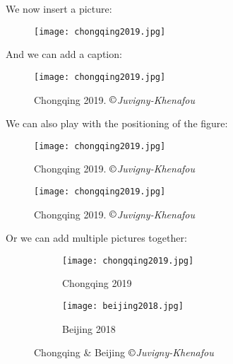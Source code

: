 \documentclass[11pt, a4paper]{article}
\begin{document}
We now insert a picture: %
\begin{figure}[ht!]
\centering
\texttt{[image: chongqing2019.jpg]} %
\end{figure}
\newpage %

And we can add a caption:
\begin{figure}[ht!]
\centering
\texttt{[image: chongqing2019.jpg]} 
\caption{Chongqing 2019. $\copyright$\textit{Juvigny-Khenafou}}
\label{picture1} %
\end{figure}

We can also play with the positioning of the figure:
\begin{figure}[ht!]
\texttt{[image: chongqing2019.jpg]} %
\captionsetup{justification=raggedright, singlelinecheck = false} %
\caption{Chongqing 2019. $\copyright$\textit{Juvigny-Khenafou}}
\label{picture2}
\end{figure}
\par

\begin{figure}[ht!]
\texttt{[image: chongqing2019.jpg]} %
\captionsetup{justification=raggedleft, singlelinecheck = false} 
\caption{Chongqing 2019. $\copyright$\textit{Juvigny-Khenafou}}
\label{picture3} 
\end{figure}
\newpage
\par

Or we can add multiple pictures together:
\begin{figure}[ht!]


	\begin{subfigure}{0.5\textwidth}
	\centering
	\texttt{[image: chongqing2019.jpg]} 
	\caption{Chongqing 2019}
	\label{fig:subim1}
	\end{subfigure}
	\begin{subfigure}{0.5\textwidth}
	\centering
	\texttt{[image: beijing2018.jpg]}
	\caption{Beijing 2018}
	\label{fig:subim2}
	\end{subfigure}

\caption{Chongqing \& Beijing $\copyright$\textit{Juvigny-Khenafou}}
\label{picture4}
\end{figure}
\par
\end{document}
